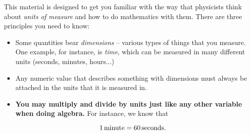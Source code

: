 \documentclass[12pt]{article}
\newcommand{\BI}{\begin{itemize}}
\newcommand{\EI}{\end{itemize}}
\begin{document}
\Large
\centerline{}

\normalsize
\centerline{}


This material is designed to get you familiar with the way that physicists think about {\it units of measure}
and how to do mathematics with them. There are three principles you need to know:

\BI
\item Some quantities bear {\it dimensions} -- various types of things that you measure. One example, for instance, is {\it time},
which can be measured in many different units (seconds, minutes, hours...)

\item Any numeric value that describes something with dimensions must always be attached in the units that it is measured in.

\item {\bf You may multiply and divide by units just like any other variable when doing algebra.}
For instance, we know that

$$
1 \,{\rm minute} = 60 \,{\rm seconds}.
$$
\EI
\end{document}
